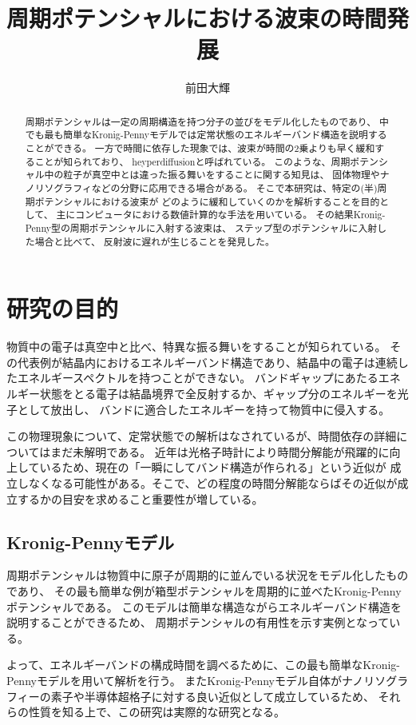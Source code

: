 \documentclass[autodetect-engine,dvipdfmx-if-dvi,ja=standard,a4paper,layout=v2]{bxjsreport}
\author{前田大輝}
\title{周期ポテンシャルにおける波束の時間発展}
\begin{document}
    \maketitle
    \begin{abstract}
        周期ポテンシャルは一定の周期構造を持つ分子の並びをモデル化したものであり、
        中でも最も簡単なKronig-Pennyモデルでは定常状態のエネルギーバンド構造を説明することができる。
        一方で時間に依存した現象では、波束が時間の2乗よりも早く緩和することが知られており、
        heyperdiffusionと呼ばれている。
        このような、周期ポテンシャル中の粒子が真空中とは違った振る舞いをすることに関する知見は、
        固体物理やナノリソグラフィなどの分野に応用できる場合がある。
        そこで本研究は、特定の(半)周期ポテンシャルにおける波束が
        どのように緩和していくのかを解析することを目的として、
        主にコンピュータにおける数値計算的な手法を用いている。
        その結果Kronig-Penny型の周期ポテンシャルに入射する波束は、
        ステップ型のポテンシャルに入射した場合と比べて、
        反射波に遅れが生じることを発見した。
    \end{abstract}
    \tableofcontents
    \chapter{研究の目的}
    \begin{chapterabstract}
        物質中の電子は真空中と比べ、特異な振る舞いをすることが知られている。
        その代表例が結晶内におけるエネルギーバンド構造であり、結晶中の電子は連続したエネルギースペクトルを持つことができない。
        バンドギャップにあたるエネルギー状態をとる電子は結晶境界で全反射するか、ギャップ分のエネルギーを光子として放出し、
        バンドに適合したエネルギーを持って物質中に侵入する。\par
        この物理現象について、定常状態での解析はなされているが、時間依存の詳細についてはまだ未解明である。
        近年は光格子時計により時間分解能が飛躍的に向上しているため、現在の「一瞬にしてバンド構造が作られる」という近似が
        成立しなくなる可能性がある。そこで、どの程度の時間分解能ならばその近似が成立するかの目安を求めること重要性が増している。\par
    \end{chapterabstract}
    \section{Kronig-Pennyモデル}
    周期ポテンシャルは物質中に原子が周期的に並んでいる状況をモデル化したものであり、
    その最も簡単な例が箱型ポテンシャルを周期的に並べたKronig-Pennyポテンシャルである。
    このモデルは簡単な構造ながらエネルギーバンド構造を説明することができるため、
    周期ポテンシャルの有用性を示す実例となっている。\par
    よって、エネルギーバンドの構成時間を調べるために、この最も簡単なKronig-Pennyモデルを用いて解析を行う。
    またKronig-Pennyモデル自体がナノリソグラフィーの素子や半導体超格子に対する良い近似として成立しているため、
    それらの性質を知る上で、この研究は実際的な研究となる。
\end{document}

